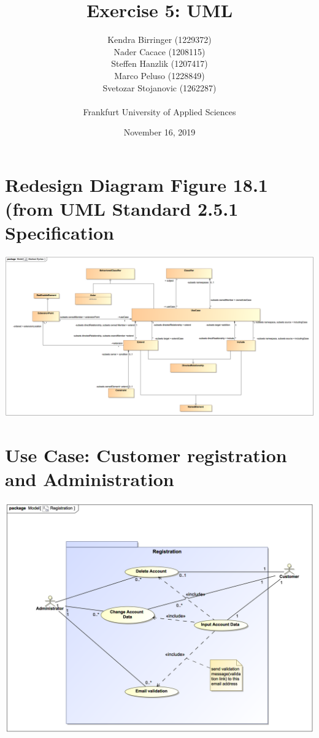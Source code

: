 \documentclass[a4paper, 12pt]{article}
\title{Exercise 5: UML}
\author{
    Kendra Birringer (1229372)\\
    Nader Cacace (1208115)\\
    Steffen Hanzlik (1207417)\\
    Marco Peluso (1228849)\\
    Svetozar Stojanovic (1262287)\\
    \\
    Frankfurt University of Applied Sciences
}
\date{November 16, 2019}
\begin{document}
\maketitle
\newpage
\tableofcontents

\newpage
\section{Redesign Diagram Figure 18.1 (from UML Standard 2.5.1 Specification\cite{uml251specpdf}}
\begin{center}
\includegraphics[scale=0.4, angle=90, origin=c]{01-abstract-syntax.png}
\end{center}

\section{Use Case: Customer registration and Administration}
\begin{center}
\includegraphics[scale=0.5]{02-e-bike-rental-service-variant-1-01.png}
\end{center}
\end{document}
